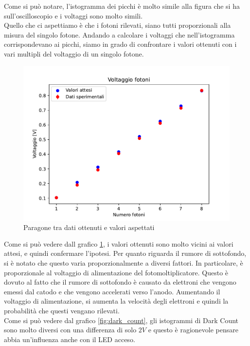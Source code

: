 Come si può notare, l'istogramma dei picchi è molto simile alla figura che si ha sull'oscilloscopio e i voltaggi sono molto simili.\\
Quello che ci aspettiamo è che i fotoni rilevati, siano tutti proporzionali alla misura del singolo fotone. Andando a calcolare i voltaggi che nell'istogramma corrispondevano ai picchi, siamo in grado di confrontare i valori ottenuti con i vari multipli del voltaggio di un singolo fotone.\\

\pagebreak
\begin{figure}
    \centering
    \includegraphics[width=\linewidth]{Photomultiplier/assets/Voltaggio_fotoni.pdf}
    \caption{Paragone tra dati ottenuti e valori aspettati}
    \label{fig:voltaggio_fotoni}
\end{figure}

Come si può vedere dall grafico \ref{fig:voltaggio_fotoni}, i valori ottenuti sono molto vicini ai valori attesi, e quindi confermare l'ipotesi.
Per quanto riguarda il rumore di sottofondo, si è notato che questo varia proporzionalmente a diversi fattori. In particolare, è proporzionale al voltaggio di alimentazione del fotomoltiplicatore. Questo è dovuto al fatto che il rumore di sottofondo è causato da elettroni che vengono emessi dal catodo e che vengono accelerati verso l'anodo. Aumentando il voltaggio di alimentazione, si aumenta la velocità degli elettroni e quindi la probabilità che questi vengano rilevati.\\

Come si può vedere dal grafico \ref{fig:dark_count}, gli istogrammi di Dark Count sono molto diversi con una differenza di solo $2V$ e questo è ragionevole pensare abbia un'influenza anche con il LED acceso.\\

